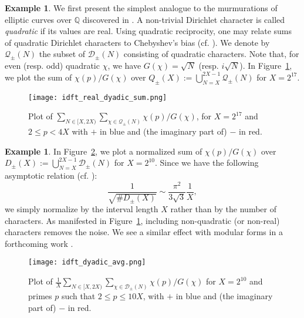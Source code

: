\documentclass{amsart}
\theoremstyle{definition}
\newtheorem{example}[theorem]{Example}
\numberwithin{equation}{section}
\begin{document}
\begin{example}\label{ex.quadratic}
We first present the simplest analogue to the murmurations of elliptic curves over $\mathbb{Q}$ discovered in \cite{HLOP}.
A non-trivial Dirichlet character is called {\em quadratic} if its values are real.
Using quadratic reciprocity, one may relate sums of quadratic Dirichlet characters to Chebyshev's bias (cf. \cite{RS}).
We denote by $\mathcal{Q}_\pm(N)$ the subset of $\mathcal{D}_{\pm}(N)$ consisting of quadratic characters. 
Note that, for even (resp. odd) quadratic $\chi$, we have $G(\chi)= \sqrt N$ (resp. $i\sqrt N$).
In Figure~\ref{fig:idft_real_dyadic_sum}, we plot the sum of $\chi(p)/G(\chi)$ over $Q_{\pm}(X):=\bigcup_{N=X}^{2X-1} \mathcal{Q}_\pm(N)$ for $X=2^{17}$. 
\end{example}

\begin{figure}[h]
\centering
\texttt{[image: idft\_real\_dyadic\_sum.png]}
\caption{\sf Plot of $\sum_{N \in [X, 2X)}\sum_{\chi \in \mathcal{Q}_\pm(N)} \chi(p)/G(\chi)$, for $X = 2^{17}$ and $2 \leq p < 4X$ with $+$ in blue and (the imaginary part of) $-$ in red.}\label{fig:idft_real_dyadic_sum}
\end{figure}

\begin{example}\label{ex.orbits}
In Figure~\ref{fig:idft_dyadic_avg}, we plot a normalized sum of $\chi(p)/G(\chi)$ over $D_{\pm}(X):=\bigcup_{N=X}^{2X-1} \mathcal{D}_\pm(N)$ for $X=2^{10}$. 
Since we have the following asymptotic relation (cf. \cite{J73}):
\begin{equation}\label{eq.chipi}
\frac{1}{\sqrt{\# D_{\pm}(X)}} \sim  \frac{\pi^2}{3\sqrt{3}}\frac{1}{X},
\end{equation}
we simply normalize by the interval length $X$ rather than by the number of characters. 
As manifested in Figure~\ref{fig:idft_real_dyadic_sum}, including non-quadratic (or non-real) characters removes the noise. 
We see a similar effect with modular forms in a forthcoming work \cite{HLOPS}.
\end{example}

\begin{figure}[h]
\texttt{[image: idft\_dyadic\_avg.png]}
\caption{\sf Plot of $\frac{1}{X}\sum_{N \in [X, 2X)}\sum_{\chi \in \mathcal{D}_\pm(N)} \chi(p)/G(\chi)$ for $X = 2^{10}$ and primes $p$ such that $2 \leq p \leq 10 X$, with $+$ in blue and (the imaginary part of) $-$ in red. }
\label{fig:idft_dyadic_avg}
\end{figure}
\end{document}
